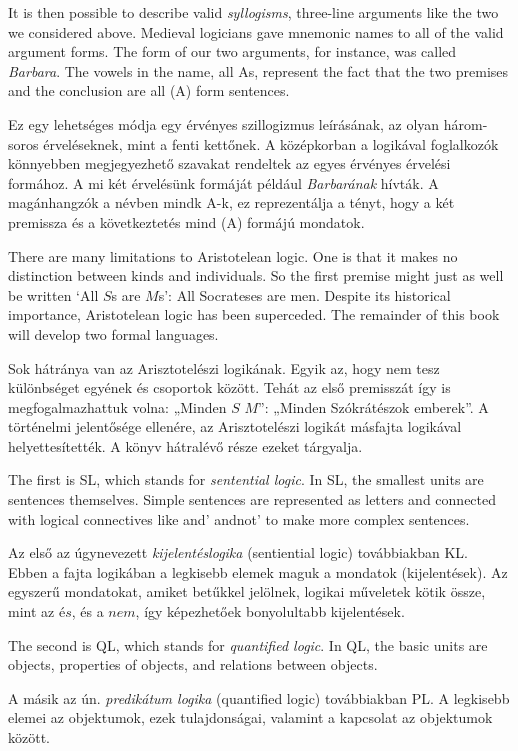It is then possible to describe valid \emph{syllogisms}, three-line arguments like the two we considered above. Medieval logicians gave mnemonic names to all of the valid argument forms. The form of our two arguments, for instance, was called \emph{Barbara}. The vowels in the name, all As, represent the fact that the two premises and the conclusion are all (A) form sentences.

Ez egy lehetséges módja egy érvényes szillogizmus leírásának, az olyan három-soros érveléseknek, mint a fenti kettőnek. A középkorban a logikával foglalkozók könnyebben megjegyezhető szavakat rendeltek az egyes érvényes érvelési formához. A mi két érvelésünk formáját például \emph{Barbarának} hívták. A magánhangzók a névben mindk A-k, ez reprezentálja a tényt, hogy a két premissza és a következtetés mind (A) formájú mondatok. 


There are many limitations to Aristotelean logic. One is that it makes no distinction between kinds and individuals. So the first premise might just as well be written `All $S$s are $M$s': All Socrateses are men. Despite its historical importance, Aristotelean logic has been superceded. The remainder of this book will develop two formal languages. 

Sok hátránya van az Arisztotelészi logikának. Egyik az, hogy nem tesz különbséget egyének és csoportok között. Tehát az első premisszát így is megfogalmazhattuk volna: „Minden $S$ $M$”: „Minden Szókrátészok emberek”. A történelmi jelentősége ellenére, az Arisztotelészi logikát másfajta logikával helyettesítették. A könyv hátralévő része ezeket tárgyalja.

The first is SL, which stands for \emph{sentential logic}. In SL, the smallest units are sentences themselves. Simple sentences are represented as letters and connected with {logical connectives} like and' andnot' to make more complex sentences.

Az első az úgynevezett \emph{kijelentéslogika} (sentiential logic) továbbiakban KL. Ebben a fajta logikában a legkisebb elemek maguk a mondatok (kijelentések). Az egyszerű mondatokat, amiket betűkkel jelölnek, logikai műveletek kötik össze, mint az $és$, és a $nem$, így képezhetőek bonyolultabb kijelentések.


The second is QL, which stands for \emph{quantified logic}. In QL, the basic units are objects, properties of objects, and relations between objects.

A másik az ún. \emph{predikátum logika} (quantified logic) továbbiakban PL. A legkisebb elemei az objektumok, ezek tulajdonságai, valamint a kapcsolat az objektumok között.




